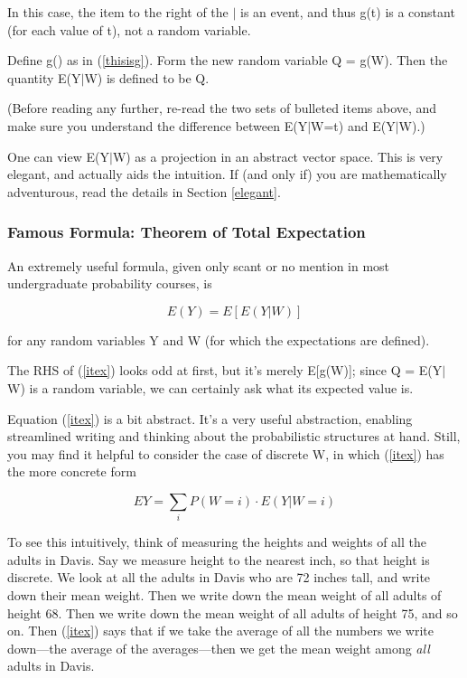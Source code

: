 In this case, the item to the right of the $|$ is an event, and thus
g(t) is a constant (for each value of t), not a random variable.

\begin{definition}

Define g() as in (\ref{thisisg}).  Form the new random variable Q =
g(W).  Then the quantity E(Y$|$W) is defined to be Q. 

\end{definition}

(Before reading any further, re-read the two sets of bulleted items
above, and make sure you understand the difference between E(Y$|$W=t)
and E(Y$|$W).)

One can view E(Y$|$W) as a projection in an abstract vector space.  This
is very elegant, and actually aids the intuition.  If (and only if) you
are mathematically adventurous, read the details in Section
\ref{elegant}.

\subsubsection{Famous Formula: Theorem of Total Expectation}

An extremely useful formula, given only scant or no mention in
most undergraduate probability courses, is 

\begin{equation}
\label{itex}
E(Y)=E[E(Y|W)]
\end{equation}

for any random variables Y and W (for which the expectations are
defined).  

The RHS of (\ref{itex}) looks odd at first, but it's merely E[g(W)];
since Q =  E(Y$|$W) is a random variable, we can certainly ask what its
expected value is.

Equation (\ref{itex}) is a bit abstract.  It's a very useful
abstraction, enabling streamlined writing and thinking about the
probabilistic structures at hand.  Still, you may find it helpful to
consider the case of discrete W, in which (\ref{itex}) has the more
concrete form

\begin{equation}
\label{itexdiscrete}
EY = \sum_{i} P(W=i) \cdot E(Y|W=i)
\end{equation}

To see this intuitively, think of measuring the heights and weights of
all the adults in Davis.  Say we measure height to the nearest inch, so
that height is discrete.  We look at all the adults in Davis who are 72
inches tall, and write down their mean weight.  Then we write down the
mean weight of all adults of height 68.  Then we write down the mean
weight of all adults of height 75, and so on.  Then (\ref{itex}) says
that if we take the average of all the numbers we write down---the
average of the averages---then we get the mean weight among {\it all}
adults in Davis.  

